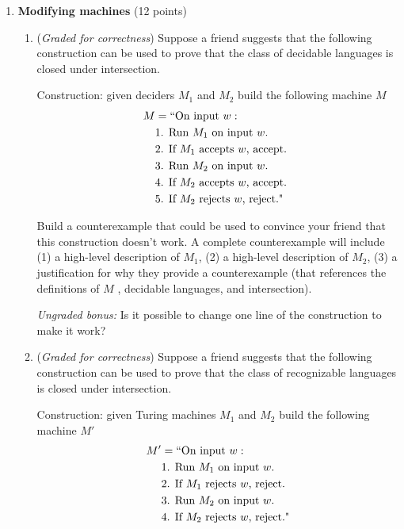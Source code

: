 \documentclass[12pt, oneside]{article}
\newcommand{\gradeCorrect}{({\it Graded for correctness}) }
\begin{document}
\begin{enumerate}[wide, labelwidth=!, labelindent=0pt]
\item\textbf{Modifying machines} (12 points)

\begin{enumerate}
\item\gradeCorrect
Suppose a friend suggests that the following construction can be used
to prove that the class of decidable languages is closed under intersection.

Construction: given deciders $M_1$ and $M_2$ build the following machine $M$
\begin{align*}
    M &= ``\text{On input }w:\\
     &\text{1. Run $M_1$ on input $w$.}\\
     &\text{2. If $M_1$ accepts $w$, accept. } \\
     &\text{3. Run $M_2$ on input $w$.} \\
     &\text{4. If $M_2$ accepts $w$, accept.}\\
     &\text{5. If $M_2$ rejects $w$, reject."}\\
 \end{align*}

 Build a counterexample that could be used to convince your friend that this 
 construction doesn't work. A complete counterexample will include (1) a high-level description of $M_1$, (2) a high-level description of $M_2$, (3) a justification for why they provide a counterexample (that references
 the definitions of $M$ , decidable languages, and intersection).

 {\it Ungraded bonus:} Is it possible to change one line of the construction to make it work?

 \item\gradeCorrect
 Suppose a friend suggests that the following construction can be used
 to prove that the class of recognizable languages is closed under intersection.
 
 Construction: given Turing machines $M_1$ and $M_2$ build the following machine $M'$
\begin{align*}
    M' &= ``\text{On input }w:\\
     &\text{1. Run $M_1$ on input $w$.}\\
     &\text{2. If $M_1$ rejects $w$, reject.} \\
     &\text{3. Run $M_2$ on input $w$.} \\
     &\text{4. If $M_2$ rejects $w$, reject."}\\
 \end{align*}


\end{enumerate}
\end{enumerate}
\end{document}
